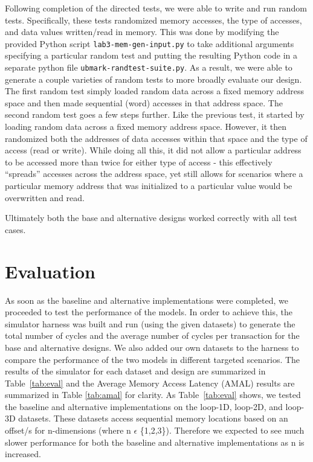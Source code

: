 \documentclass[10pt]{article}
\begin{document}
Following completion of the directed tests, we were able to write and run random tests. Specifically, these tests randomized memory accesses, the type of accesses, and data values written/read in memory. This was done by modifying the provided Python script \texttt{lab3-mem-gen-input.py} to take additional arguments specifying a particular random test and putting the resulting Python code in a separate python file \texttt{ubmark-randtest-suite.py}. As a result, we were able to generate a couple varieties of random tests to more broadly evaluate our design. The first random test simply loaded random data across a fixed memory address space and then made sequential (word) accesses in that address space. The second random test goes a few steps further. Like the previous test, it started by loading random data across a fixed memory address space. However, it then randomized both the addresses of data accesses within that space and the type of access (read or write). While doing all this, it did not allow a particular address to be accessed more than twice for either type of access - this effectively ``spreads'' accesses across the address space, yet still allows for scenarios where a particular memory address that was initialized to a particular value would be overwritten and read.



Ultimately both the base and alternative designs worked correctly with all test cases.  \\


\section{Evaluation}

As soon as the baseline and alternative implementations were completed, we proceeded to test the performance of the models. In order to achieve this, the simulator harness was built and run (using the given datasets) to generate the total number of cycles and the average number of cycles per transaction for the base and alternative designs. We also added our own datasets to the harness to compare the performance of the two models in different targeted scenarios. The results of the simulator for each dataset and design are summarized in Table~\ref{tab:eval} and the Average Memory Access Latency (AMAL) results are summarized in Table \ref{tab:amal} for clarity. As Table~\ref{tab:eval} shows, we tested the baseline and alternative implementations on the loop-1D, loop-2D, and loop-3D datasets. These datasets access sequential memory locations based on an offset/s for n-dimensions (where n $\epsilon$ \{1,2,3\}). Therefore we expected to see much slower performance for both the baseline and alternative implementations as n is increased. \\
\end{document}
